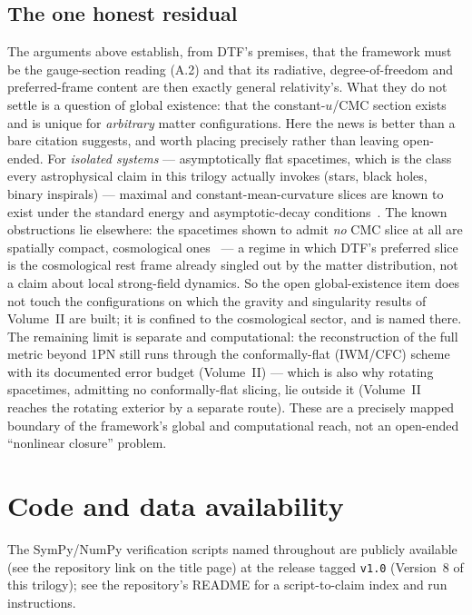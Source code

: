 \documentclass[11pt]{article}
\begin{document}
\subsection*{The one honest residual}
The arguments above establish, from DTF's premises, that the framework must be the gauge-section reading
(A.2) and that its radiative, degree-of-freedom and preferred-frame content are then exactly general
relativity's. What they do not settle is a question of global existence: that the constant-$u$/CMC section
exists and is unique for \emph{arbitrary} matter configurations. Here the news is better than a bare
citation suggests, and worth placing precisely rather than leaving open-ended. For \emph{isolated systems}
--- asymptotically flat spacetimes, which is the class every astrophysical claim in this trilogy actually
invokes (stars, black holes, binary inspirals) --- maximal and constant-mean-curvature slices are known to
exist under the standard energy and asymptotic-decay conditions~\cite{Bartnik1984,MarsdenTipler1980,Gerhardt1983}.
The known obstructions lie elsewhere: the spacetimes shown to admit \emph{no} CMC slice at all are
spatially compact, cosmological ones~\cite{Bartnik1988} --- a regime in which DTF's preferred slice is the
cosmological rest frame already singled out by the matter distribution, not a claim about local strong-field
dynamics. So the open global-existence item does not touch the configurations on which the gravity and
singularity results of Volume~II are built; it is confined to the cosmological sector, and is named there.
The remaining limit is separate and computational: the reconstruction of the full metric beyond 1PN still
runs through the conformally-flat (IWM/CFC) scheme with its documented error budget (Volume~II) --- which is
also why rotating spacetimes, admitting no conformally-flat slicing, lie outside it (Volume~II reaches the
rotating exterior by a separate route). These are a precisely mapped boundary of the framework's global and
computational reach, not an open-ended ``nonlinear closure'' problem.

\section*{Code and data availability}
{\small The SymPy/NumPy verification scripts named throughout are publicly available (see the repository
link on the title page) at the release tagged \texttt{v1.0} (Version~8 of this trilogy); see the
repository's README for a script-to-claim index and run instructions.\par}
\end{document}
